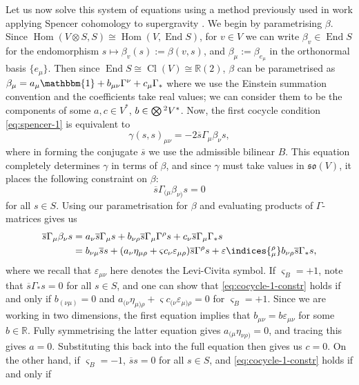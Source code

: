 \documentclass[pdftex]{sigma}
\numberwithin{equation}{section}
\newcommand{\fso}{\mathfrak{so}}
\newcommand{\RR}{\mathbb{R}}
\newcommand{\Otimes}{\mathchoice{{\textstyle\bigotimes}}{\bigotimes}{\bigotimes}{\bigotimes}}
\newcommand{\1}{\mathbbm{1}}
\DeclareMathOperator{\End}{End}
\DeclareMathOperator{\Hom}{Hom}
\DeclareMathOperator{\Cl}{Cl}
\begin{document}
Let us now solve this system of equations using a method previously used in work applying Spencer cohomology to supergravity \cite{Beckett2021,deMedeiros2016,deMedeiros2018,Figueroa-OFarrill2017}. We begin by parametrising $\beta$. Since $\Hom(V\otimes S,S)\cong\Hom(V,\End S)$, for $v\in V$ we can write $\beta_v\in\End S$ for the endomorphism $s\mapsto\beta_v(s):=\beta(v,s)$, and $\beta_\mu:=\beta_{e_\mu}$ in the orthonormal basis $\{e_\mu\}$. Then since $\End S\cong \Cl(V)\cong\RR(2)$, $\beta$ can be parametrised as
$\beta_\mu = a_\mu \1 + b_{\mu\nu}\Gamma^\nu + c_\mu \Gamma_*
$
where we use the Einstein summation convention and the coefficients take real values; we can consider them to be the components of some $a,c\in V^*$, $b\in \Otimes^2V^*$. Now, the first cocycle condition \eqref{eq:spencer-1} is equivalent to
\[
	\gamma(s,s)_{\mu\nu} = -2\overline{s}\Gamma_\mu\beta_\nu s,
\]
where in forming the conjugate $\overline{s}$ we use the admissible bilinear $B$. This equation completely determines $\gamma$ in terms of $\beta$, and since $\gamma$ must take values in $\fso(V)$, it places the following constraint on $\beta$:
\begin{equation}\label{eq:cocycle-1-constr}
	\overline{s}\Gamma_{(\mu}\beta_{\nu)} s = 0
\end{equation}
for all $s\in S$. Using our parametrisation for $\beta$ and evaluating products of $\Gamma$-matrices gives us
\begin{align*}
	\overline{s}\Gamma_\mu\beta_\nu s
		&= a_\nu\overline{s}\Gamma_\mu s + b_{\nu\rho}\overline{s}\Gamma_\mu\Gamma^\rho s + c_\nu\overline{s}\Gamma_\mu\Gamma_*s	\\
		&= b_{\nu\mu}\overline{s}s + (a_\nu\eta_{\mu\rho} + \varsigma c_\nu\varepsilon_{\mu\rho})\overline{s}\Gamma^\rho s + \varepsilon\indices{_\mu^\rho} b_{\nu\rho}\overline{s}\Gamma_* s,
\end{align*}
where we recall that $\varepsilon_{\mu\nu}$ here denotes the Levi-Civita symbol. If $\varsigma_B=+1$, note that $\overline s\Gamma_*s=0$ for all $s\in S$, and one can show that \eqref{eq:cocycle-1-constr} holds if and only if
$b_{(\nu\mu)} = 0
$ and $
	a_{(\nu}\eta_{\mu)\rho}+\varsigma c_{(\nu}\varepsilon_{\mu)\rho} = 0$ for $\varsigma_B=+1$.
Since we are working in two dimensions, the first equation implies that ${b_{\mu\nu}=b\varepsilon_{\mu\nu}}$ for some $b\in\RR$. Fully symmetrising the latter equation gives $a_{(\mu}\eta_{\nu\rho)}=0$, and tracing this gives ${a=0}$. Substituting this back into the full equation then gives us $c=0$. On the other hand, if $\varsigma_B=-1$, $\overline{s}s = 0$ for all $s\in S$, and \eqref{eq:cocycle-1-constr} holds if and only if
\end{document}
